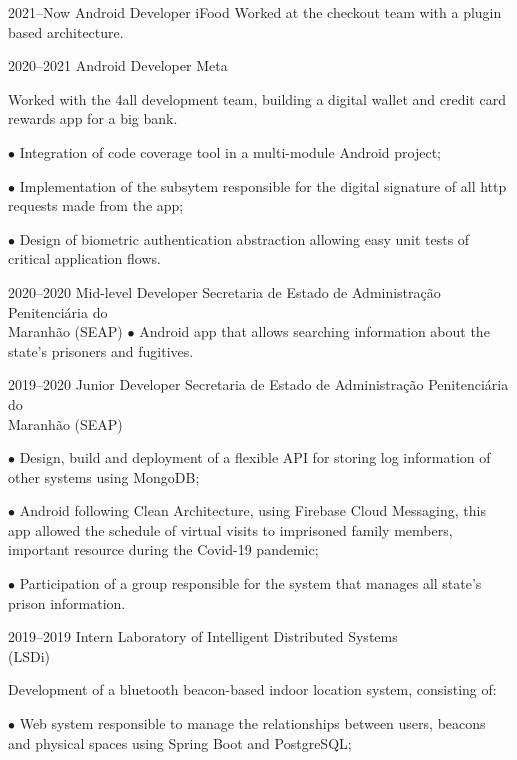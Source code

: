 \documentclass[]{../document-class/twentysecondcv}
\begin{document}
\begin{twenty}
	\twentyitem
		{2021--Now}
		{Android Developer}
		{iFood}
		{
			Worked at the checkout team with a plugin based architecture.
		}

	\twentyitem
		{2020--2021}
		{Android Developer}
		{Meta}
		{
			Worked with the 4all development team, building a digital wallet and credit card rewards app for a big bank. \vskip 4pt

			$\bullet$ Integration of code coverage tool in a multi-module Android project; \vskip 4pt

			$\bullet$ Implementation of the subsytem responsible for the digital signature of all http requests made from the app; \vskip 4pt

			$\bullet$ Design of biometric authentication abstraction allowing easy unit tests of critical application flows.

		}

	\twentyitem
		{2020--2020}
		{Mid-level Developer}
		{Secretaria de Estado de Administração Penitenciária do \\\hspace*{\fill}Maranhão (SEAP)}
		{
			$\bullet$ Android app that allows searching information about the state's prisoners and fugitives.
		}

	\twentyitem
		{2019--2020}
		{Junior Developer}
		{Secretaria de Estado de Administração Penitenciária do \\\hspace*{\fill}Maranhão (SEAP)}
		{
			$\bullet$ Design, build and deployment of a flexible API for storing log information of other systems using MongoDB;\vskip 4pt

			$\bullet$ Android following Clean Architecture, using Firebase Cloud Messaging, this app allowed the schedule of virtual visits to imprisoned family members, important resource during the Covid-19 pandemic;\vskip 4pt

			$\bullet$ Participation of a group responsible for the system that manages all state's prison information.
		}
		
	\twentyitem
		{2019--2019}
		{Intern}
		{Laboratory of Intelligent Distributed Systems \\\hspace*{\fill}(LSDi)}
		{
			Development of a bluetooth beacon-based indoor location system, consisting of:\vskip 4pt

			$\bullet$ Web system responsible to manage the relationships between users, beacons and physical spaces using Spring Boot and PostgreSQL;\vskip 4pt

}
\end{twenty}
\end{document}
